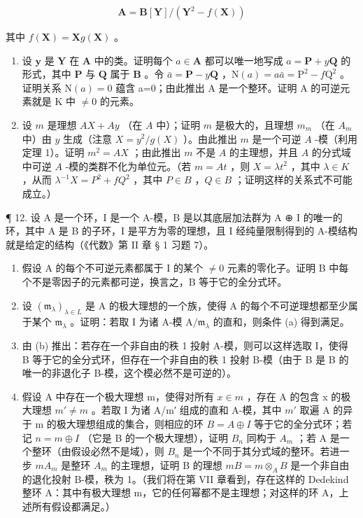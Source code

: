 \[
\mathbf {A} = \mathbf {B} [ \mathbf {Y} ] / (\mathbf {Y} ^ {2} - f (\mathbf {X}))
\]

其中 \(f(\mathbf{X}) = \mathbf{X}g(\mathbf{X})\) 。

\begin{enumerate}
\def\labelenumi{(\alph{enumi})}
\item
  设 \(\pmb{y}\) 是 \(\mathbf{Y}\) 在 \(\mathbf{A}\) 中的类。证明每个 \(a \in \mathbf{A}\) 都可以唯一地写成 \(a = \mathbf{P} + y\mathbf{Q}\) 的形式，其中 \(\mathbf{P}\) 与 \(\mathbf{Q}\) 属于 \(\mathbf{B}\) 。令 \(\bar{a} = \mathbf{P} - y\mathbf{Q}\) ，\(\mathrm{N}(a)=a\bar{a}=\mathrm{P}^{2}-f\mathrm{Q}^{2}\) 。证明关系 \(\mathrm{N}(a)=0\) 蕴含 a=0；由此推出 A 是一个整环。证明 A 的可逆元素就是 K 中 \(\neq0\) 的元素。
\item
  设 \(m\) 是理想 \(AX + Ay\) （在 \(A\) 中）；证明 \(m\) 是极大的，且理想 \(m_m\) （在 \(A_m\) 中）由 \(y\) 生成（注意 \(X = y^2 / g(X)\) ）。由此推出 \(m\) 是一个可逆 \(A\) -模（利用定理 1）。证明 \(m^2 = AX\) ；由此推出 \(m\) 不是 \(A\) 的主理想，并且 \(A\) 的分式域中可逆 \(A\) -模的类群不化为单位元。（若 \(m = At\) ，则 \(X = \lambda t^2\) ，其中 \(\lambda \in K\) ，从而 \(\lambda^{-1}X = P^2 + fQ^2\) ，其中 \(P \in B\) ，\(Q \in B\) ；证明这样的关系式不可能成立。）
\end{enumerate}

¶ 12. 设 A 是一个环，I 是一个 A-模，B 是以其底层加法群为 A ⊕ I 的唯一的环，其中 A 是 B 的子环，I 是平方为零的理想，且 I 经纯量限制得到的 A-模结构就是给定的结构（《代数》第 II 章 § 1 习题 7）。

\begin{enumerate}
\def\labelenumi{(\alph{enumi})}
\item
  假设 A 的每个不可逆元素都属于 I 的某个 \(\neq0\) 元素的零化子。证明 B 中每个不是零因子的元素都可逆，换言之，B 等于它的全分式环。
\item
  设 \((\mathfrak{m}_{\lambda})_{\lambda \in L}\) 是 A 的极大理想的一个族，使得 A 的每个不可逆理想都至少属于某个 \(\mathfrak{m}_{\lambda}\) 。证明：若取 I 为诸 A-模 \(\mathrm{A} / \mathfrak{m}_{\lambda}\) 的直和，则条件 (a) 得到满足。
\item
  由 (b) 推出：若存在一个非自由的秩 1 投射 A-模，则可以这样选取 I，使得 B 等于它的全分式环，但存在一个非自由的秩 1 投射 B-模（由于 B 是 B 的唯一的非退化子 B-模，这个模必然不是可逆的）。
\item
  假设 A 中存在一个极大理想 m，使得对所有 \(x \in m\) ，存在 A 的包含 x 的极大理想 \(m' \neq m\) 。若取 I 为诸 A/m′ 组成的直和 A-模，其中 \(m'\) 取遍 A 的异于 m 的极大理想组成的集合，则相应的环 \(B = A \oplus I\) 等于它的全分式环；若记 \(n = m \oplus I\) （它是 B 的一个极大理想），证明 \(B_n\) 同构于 \(A_m\) ；若 A 是一个整环（由假设必然不是域），则 \(B_n\) 是一个不同于其分式域的整环。若进一步 \(mA_m\) 是整环 \(A_m\) 的主理想，证明 B 的理想 \(mB = m \otimes_A B\) 是一个非自由的退化投射 B-模，秩为 1。（我们将在第 VII 章看到，存在这样的 Dedekind 整环 A：其中有极大理想 m，它的任何幂都不是主理想；对这样的环 A，上述所有假设都满足。）
\end{enumerate}

